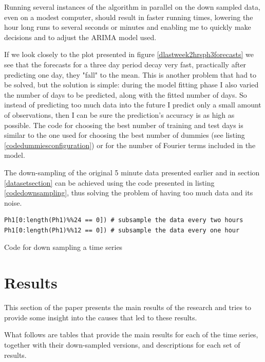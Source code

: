 \documentclass[12pt,a4paper,titlepage]{report}
\begin{document}
Running several instances of the algorithm in parallel on the down sampled data, even on a modest computer, should result in faster running times, lowering the hour long runs to several seconds or minutes and enabling me to quickly make decisions and to adjust the ARIMA model used.

If we look closely to the plot presented in figure \ref{dlastweek2hrsph3forecasts} we see that the forecasts for a three day period decay very fast, practically after predicting one day, they "fall" to the mean. This is another problem that had to be solved, but the solution is simple: during the model fitting phase I also varied the number of days to be predicted, along with the fitted number of days. So instead of predicting too much data into the future I predict only a small amount of observations, then I can be sure the prediction's accuracy is as high as possible.
The code for choosing the best number of training and test days is similar to the one used for choosing the best number of dummies (see listing \ref{codedummiesconfiguration}) or for the number of Fourier terms included in the model.

The down-sampling of the original 5 minute data presented earlier and in section \ref{datasetsection} can be achieved using the code presented in listing \ref{codedownsampling}, thus solving the problem of having too much data and its noise.

\begin{listing}[h]
    \begin{verbatim}
Ph1[0:length(Ph1)%%24 == 0]) # subsample the data every two hours
Ph1[0:length(Ph1)%%12 == 0]) # subsample the data every one hour
    \end{verbatim}
    
    \caption{Code for down sampling a time series}
    \label{codedownsampling}
\end{listing}

\section{Results} \label{resultssection}

This section of the paper presents the main results of the research and tries to provide some insight into the causes that led to these results.

What follows are tables that provide the main results for each of the time series, together with their down-sampled versions, and descriptions for each set of results.
\end{document}
